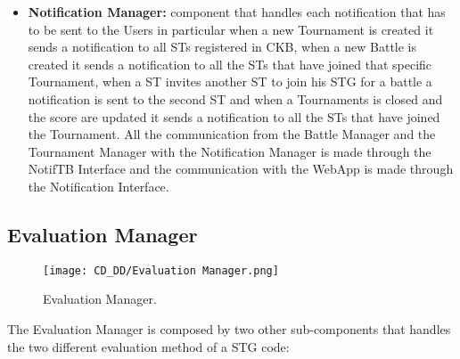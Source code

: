 \begin{itemize}
    \item \textbf{Notification Manager:} component that handles each notification that has to be sent to the Users in particular when a new Tournament is created it sends a notification to all STs registered in CKB, when a new Battle is created it sends a notification to all the STs that have joined that specific Tournament, when a ST invites another ST to join his STG for a battle a notification is sent to the second ST and when a Tournaments is closed and the score are updated it sends a notification to all the STs that have joined the Tournament. All the communication from the Battle Manager and the Tournament Manager with the Notification Manager is made through the NotifTB Interface and the communication with the WebApp is made through the Notification Interface.
\end{itemize}

\subsection{Evaluation Manager}
\label{subsec:evaluation_manager}%

\begin{figure}[H]
    \begin{center}
        \texttt{[image: CD\_DD/Evaluation Manager.png]}
        \caption{Evaluation Manager.}
        \label{fig:evaluation_manager}%
    \end{center}
\end{figure}

\noindent The Evaluation Manager is composed by two other sub-components that handles the two different evaluation method of a STG code:

